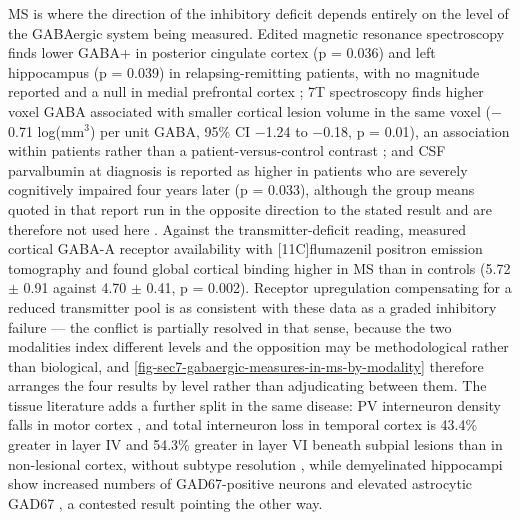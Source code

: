 \documentclass[11pt]{article}
\begin{document}
MS is where the direction of the inhibitory deficit depends entirely on the level of the GABAergic system being measured. Edited magnetic resonance spectroscopy finds lower GABA+ in posterior cingulate cortex (p = 0.036) and left hippocampus (p = 0.039) in relapsing-remitting patients, with no magnitude reported and a null in medial prefrontal cortex \citep{Cao2017}; 7T spectroscopy finds higher voxel GABA associated with smaller cortical lesion volume in the same voxel ($-$0.71 log(mm$^{3}$) per unit GABA, 95\% CI $-$1.24 to $-$0.18, p = 0.01), an association within patients rather than a patient-versus-control contrast \citep{Madsen2024}; and CSF parvalbumin at diagnosis is reported as higher in patients who are severely cognitively impaired four years later (p = 0.033), although the group means quoted in that report run in the opposite direction to the stated result and are therefore not used here \citep{Ziccardi2024}. Against the transmitter-deficit reading, \citet{Kang2020} measured cortical GABA-A receptor availability with [11C]flumazenil positron emission tomography and found global cortical binding higher in MS than in controls (5.72 $\pm$ 0.91 against 4.70 $\pm$ 0.41, p = 0.002). Receptor upregulation compensating for a reduced transmitter pool is as consistent with these data as a graded inhibitory failure --- the conflict is partially resolved in that sense, because the two modalities index different levels and the opposition may be methodological rather than biological, and \ref{fig-sec7-gabaergic-measures-in-ms-by-modality} therefore arranges the four results by level rather than adjudicating between them. The tissue literature adds a further split in the same disease: PV interneuron density falls in motor cortex \citep{Magliozzi2021,Clements2008}, and total interneuron loss in temporal cortex is 43.4\% greater in layer IV and 54.3\% greater in layer VI beneath subpial lesions than in non-lesional cortex, without subtype resolution \citep{Nicholas2015}, while demyelinated hippocampi show increased numbers of GAD67-positive neurons and elevated astrocytic GAD67 \citep{Kiljan2019}, a contested result pointing the other way.
\end{document}
